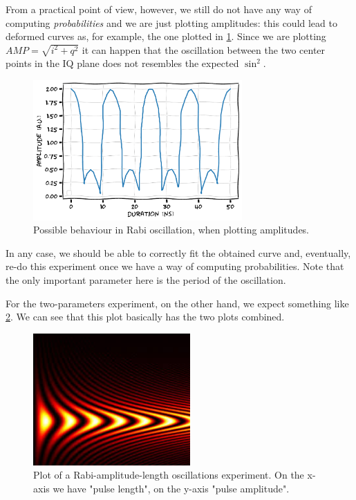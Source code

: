 From a practical point of view, however, we still do not have any way of computing \textit{probabilities} and we are just plotting amplitudes: this could lead to deformed curves as, for example, the one plotted in \cref{fig:weird_sketch_rabi}. 
Since we are plotting $AMP=\sqrt{i^2+q^2}$ it can happen that the oscillation between the two center points in the IQ plane does not resembles the expected $\sin^2$.

\begin{figure}[ht]
    \centering
    \includegraphics[width=8cm]{characterization/figures/rabi_sketch_problems.pdf}
    \caption{Possible behaviour in Rabi oscillation, when plotting amplitudes.}
    \label{fig:weird_sketch_rabi}
\end{figure}

In any case, we should be able to correctly fit the obtained curve and, eventually, re-do this experiment once we have a way of computing probabilities. Note that the only important parameter here is the period of the oscillation.

For the two-parameters experiment, on the other hand, we expect something like \cref{fig:rabi_amplitude_length}. 
We can see that this plot basically has the two plots combined.

\begin{figure}[ht]
    \centering
    \includegraphics[width=6cm]{characterization/figures/rabi_amplitude_length.png}
    \caption{Plot of a Rabi-amplitude-length oscillations experiment. On the x-axis we have "pulse length", on the y-axis "pulse amplitude".}
    \label{fig:rabi_amplitude_length}
\end{figure}

